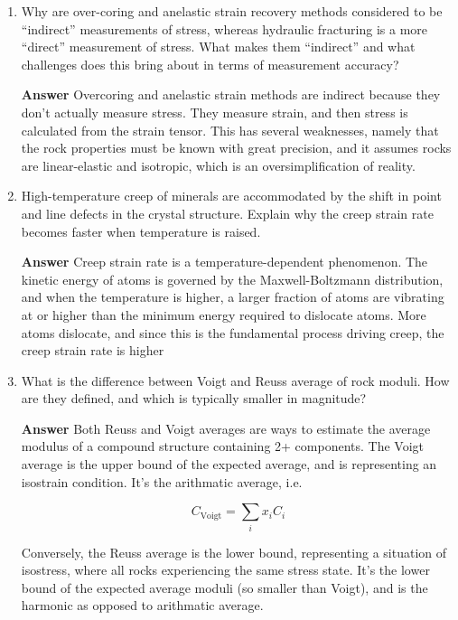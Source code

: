 \documentclass{article}
\begin{document}
\begin{enumerate}
    \item Why are over-coring and anelastic strain recovery methods considered to be “indirect” measurements of stress, whereas hydraulic fracturing is a more “direct” measurement of stress. What makes them “indirect” and what challenges does this bring about in terms of measurement accuracy?
    
    \textbf{Answer}
    Overcoring and anelastic strain methods are indirect because they don't actually measure stress. They measure strain, and then stress is calculated from the strain tensor. This has several weaknesses, namely that the rock properties must be known with great precision, and it assumes rocks are linear-elastic and isotropic, which is an oversimplification of reality.
    
    \item High-temperature creep of minerals are accommodated by the shift in point and line defects in the crystal structure. Explain why the creep strain rate becomes faster when temperature is raised.

    \textbf{Answer}
    Creep strain rate is a temperature-dependent phenomenon. The kinetic energy of atoms is governed by the Maxwell-Boltzmann distribution, and when the temperature is higher, a larger fraction of atoms are vibrating at or higher than the minimum energy required to dislocate atoms. More atoms dislocate, and since this is the fundamental process driving creep, the creep strain rate is higher

    \item What is the difference between Voigt and Reuss average of rock moduli. How are they defined, and which is typically smaller in magnitude?

    \textbf{Answer}
    Both Reuss and Voigt averages are ways to estimate the average modulus of a compound structure containing 2+ components. The Voigt average is the upper bound of the expected average, and is representing an isostrain condition. It's the arithmatic average, i.e.

\begin{equation}
    C_{\textrm{Voigt}} = \sum_i x_i C_i
\end{equation}

Conversely, the Reuss average is the lower bound, representing a situation of isostress, where all rocks experiencing the same stress state. It's the lower bound of the expected average moduli (so smaller than Voigt), and is the harmonic as opposed to arithmatic average.


\end{enumerate}
\end{document}
